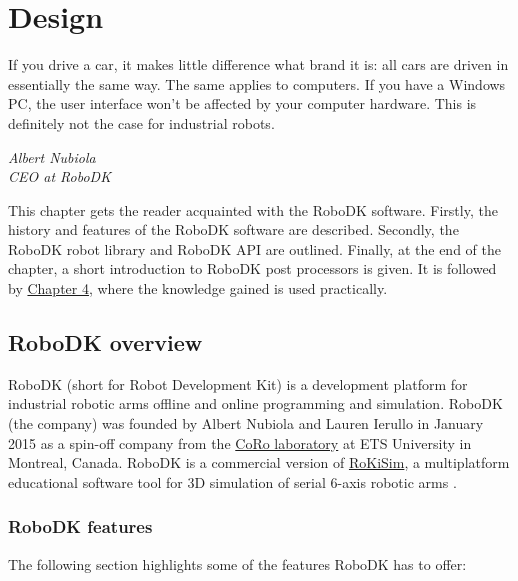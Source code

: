 \chapter{Design \label{chap:design}}



\epigraph{If you drive a car, it makes little difference what brand it is: all cars are driven
in essentially the same way. The same applies to computers. If you have a
Windows PC, the user interface won’t be affected by your computer hardware.
This is definitely not the case for industrial robots.}{\textit{Albert Nubiola \\ CEO at RoboDK}}

\par This chapter gets the reader acquainted with the RoboDK software. Firstly, the history and features of the RoboDK software are described. Secondly, the RoboDK robot library and RoboDK API are outlined. Finally, at the end of the chapter, a short introduction to RoboDK post processors is given. It is followed by  \hyperref[chap:implementation]{Chapter 4}, where the knowledge gained is used practically. 

\section{RoboDK overview}

RoboDK (short for Robot Development Kit) is a development platform for industrial robotic arms offline and online programming and simulation. 
RoboDK (the company) was founded by Albert Nubiola and Lauren Ierullo in January 2015 as a spin-off company from the \href{https://en.etsmtl.ca/unites-de-recherche/coro/accueil?lang=en-CA}{CoRo laboratory}   at ETS University in Montreal, Canada. RoboDK is a commercial version of \href{https://www.parallemic.org/RoKiSim.html}{RoKiSim}, a multiplatform educational software tool for 3D simulation of serial 6-axis robotic arms \cite{robodkoverview}.

\subsection{RoboDK features}

The following section highlights some of the features RoboDK has to offer: 


